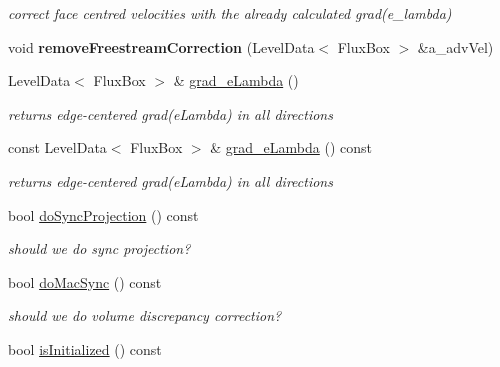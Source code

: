 \begin{DoxyCompactItemize}
\begin{DoxyCompactList}\small\item\em correct face centred velocities with the already calculated grad(e\-\_\-lambda) \end{DoxyCompactList}\item 
\hypertarget{class_c_c_projector_a77b0a8f1aa7b91bffd504965ca7c1102}{void {\bfseries remove\-Freestream\-Correction} (Level\-Data$<$ Flux\-Box $>$ \&a\-\_\-adv\-Vel)}\label{class_c_c_projector_a77b0a8f1aa7b91bffd504965ca7c1102}

\item 
Level\-Data$<$ Flux\-Box $>$ \& \hyperlink{class_c_c_projector_a69ed7e0a1be9517f8481b6933e4352ca}{grad\-\_\-e\-Lambda} ()
\begin{DoxyCompactList}\small\item\em returns edge-\/centered grad(e\-Lambda) in all directions \end{DoxyCompactList}\item 
\hypertarget{class_c_c_projector_aa29e4447b106f00580c75dd8456bcd6e}{const Level\-Data$<$ Flux\-Box $>$ \& \hyperlink{class_c_c_projector_aa29e4447b106f00580c75dd8456bcd6e}{grad\-\_\-e\-Lambda} () const }\label{class_c_c_projector_aa29e4447b106f00580c75dd8456bcd6e}

\begin{DoxyCompactList}\small\item\em returns edge-\/centered grad(e\-Lambda) in all directions \end{DoxyCompactList}\item 
\hypertarget{class_c_c_projector_afa03c1c186f18d2e8e1eea7780055d06}{bool \hyperlink{class_c_c_projector_afa03c1c186f18d2e8e1eea7780055d06}{do\-Sync\-Projection} () const }\label{class_c_c_projector_afa03c1c186f18d2e8e1eea7780055d06}

\begin{DoxyCompactList}\small\item\em should we do sync projection? \end{DoxyCompactList}\item 
\hypertarget{class_c_c_projector_a5d6a554b9a052f75596f55d9e0770f41}{bool \hyperlink{class_c_c_projector_a5d6a554b9a052f75596f55d9e0770f41}{do\-Mac\-Sync} () const }\label{class_c_c_projector_a5d6a554b9a052f75596f55d9e0770f41}

\begin{DoxyCompactList}\small\item\em should we do volume discrepancy correction? \end{DoxyCompactList}\item 
\hypertarget{class_c_c_projector_a35f319f0ad8410215bb2c6af10e7aec7}{bool \hyperlink{class_c_c_projector_a35f319f0ad8410215bb2c6af10e7aec7}{is\-Initialized} () const }\label{class_c_c_projector_a35f319f0ad8410215bb2c6af10e7aec7}


\end{DoxyCompactItemize}
